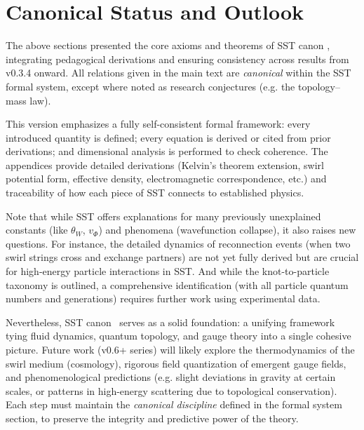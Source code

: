 \documentclass[10pt,reprint,aps,onecolumn,nofootinbib]{revtex4-2}
\begin{document}

	\section{Canonical Status and Outlook}
	The above sections presented the core axioms and theorems of SST canon \canonversion, integrating pedagogical derivations and ensuring consistency across results from v0.3.4 onward. All relations given in the main text are \emph{canonical} within the SST formal system, except where noted as research conjectures (e.g. the topology–mass law).

	This version emphasizes a fully self-consistent formal framework: every introduced quantity is defined; every equation is derived or cited from prior derivations; and dimensional analysis is performed to check coherence. The appendices provide detailed derivations (Kelvin’s theorem extension, swirl potential form, effective density, electromagnetic correspondence, etc.) and traceability of how each piece of SST connects to established physics.

	Note that while SST offers explanations for many previously unexplained constants (like $\theta_W$, $v_{\Phi}$) and phenomena (wavefunction collapse), it also raises new questions. For instance, the detailed dynamics of reconnection events (when two swirl strings cross and exchange partners) are not yet fully derived but are crucial for high-energy particle interactions in SST. And while the knot-to-particle taxonomy is outlined, a comprehensive identification (with all particle quantum numbers and generations) requires further work using experimental data.

	Nevertheless, SST canon \canonversion \ serves as a solid foundation: a unifying framework tying fluid dynamics, quantum topology, and gauge theory into a single cohesive picture. Future work (v0.6+ series) will likely explore the thermodynamics of the swirl medium (cosmology), rigorous field quantization of emergent gauge fields, and phenomenological predictions (e.g. slight deviations in gravity at certain scales, or patterns in high-energy scattering due to topological conservation). Each step must maintain the \emph{canonical discipline} defined in the formal system section, to preserve the integrity and predictive power of the theory.


	\appendix
\end{document}
